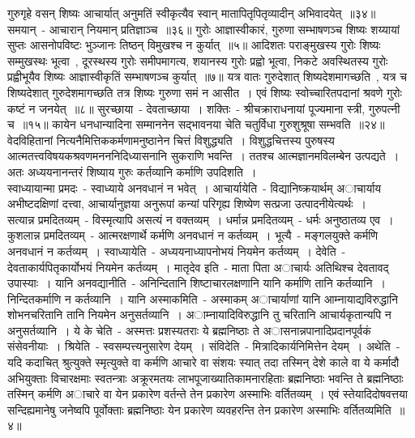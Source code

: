 \indent  गुरुगृहे वसन् शिष्यः आचार्यात्  अनुमतिं स्वीकृत्यैव स्वान्  मातापितृपितृव्यादीन् अभिवादयेत्~॥३४॥
\indent समयान्~- आचारान् नियमान् प्रतिज्ञाञ्च~॥३६॥
\indent गुरोः आज्ञास्वीकारं, गुरुणा सम्भाषणञ्च शिष्यः शय्यायां सुप्तः आसनोपविष्टः भुञ्जानः तिष्ठन् विमुखश्च न कुर्यात्~॥५॥
\indent  आदिशतः पराङ्मुखस्य गुरोः शिष्यः सम्मुखस्थः भूत्वा~, दूरस्थस्य गुरोः समीपमागत्य, शयानस्य गुरोः प्रह्वो भूत्वा, निकटे अवस्थितस्य गुरोः प्रह्वीभूयैव शिष्यः आज्ञास्वीकृतिं सम्भाषणञ्च कुर्यात्~॥७॥
\indent  यत्र वातः गुरुदेशात् शिष्यदेशमागच्छति~, यत्र च शिष्यदेशात् गुरुदेशमागच्छति तत्र शिष्यः गुरुणा समं न आसीत~। एवं    शिष्यः स्वोच्चारितपदानां श्रवणे गुरोः कष्टं न जनयेत्~॥८॥
\indent  सुरच्छाया~- देवताच्छाया~। शक्तिः~- श्रीचक्राराधनायां पूज्यमाना स्त्री, गुरुपत्नी च~॥१५॥
\indent कायेन धनधान्यादिना सम्माननेन सद्भावनया चेति चतुर्विधा गुरुशुश्रूषा सम्भवति~॥२४॥
\indent वेदविहितानां नित्यनैमित्तिककर्मणामनुष्ठानेन चित्तं विशुद्ध्यति~। विशुद्धचित्तस्य पुरुषस्य आत्मतत्त्वविषयकश्रवणमनननिदिध्यासनानि सुकराणि भवन्ति~। ततश्च आत्मज्ञानमविलम्बेन उत्पद्यते~। अतः अध्ययनानन्तरं शिष्याय गुरुः कर्तव्यानि कर्माणि उपदिशति~।\\ स्वाध्यायान्मा प्रमदः~- स्वाध्याये अनवधानं न भवेत्~। आचार्यायेति~- विद्यानिष्क्रयार्थम् अाचार्याय अभीष्टदक्षिणां दत्त्वा, आचार्यानुज्ञया अनुरूपां कन्यां परिगृह्य शिष्येण सत्प्रजा उत्पादनीयेत्यर्थः~।\\ \indent सत्यान्न प्रमदितव्यम्~- विस्मृत्यापि असत्यं न वक्तव्यम्~। धर्मान्न प्रमदितव्यम्~- धर्मः अनुष्ठातव्य एव~। कुशलान्न प्रमदितव्यम्~- आत्मरक्षणार्थे कर्मणि अनवधानं न कर्तव्यम्~। भूत्यै~- मङ्गलयुक्ते कर्मणि अनवधानं न कर्तव्यम्~। स्वाध्यायेति~- अध्ययनाध्यापनोभयं नियमेन कर्तव्यम्~। देवेति~- देवताकार्यपितृकार्योभयं नियमेन कर्तव्यम्~। मातृदेव इति~- माता पिता अाचार्यः अतिथिश्च देवतावद् उपास्याः~। यानि अनवद्यानीति~- अनिन्दितानि शिष्टाचारलक्षणानि यानि कर्माणि तानि कर्तव्यानि~। निन्दितकर्माणि न कर्तव्यानि~। यानि अस्माकमिति~- अस्माकम् अाचार्याणां यानि आम्नायाद्यविरुद्धानि शोभनचरितानि तानि नियमेन अनुसर्तव्यानि~। अाम्नायादिविरुद्धानि तु चरितानि आचार्यकृतान्यपि न अनुसर्तव्यानि~। ये के चेति~- अस्मत्तः प्रशस्यतराः ये ब्रह्मनिष्ठाः ते अासनान्नपानादिप्रदानपूर्वकं संसेवनीयाः~। श्रियेति~- स्वसम्पत्त्यनुसारेण देयम्~। संविदेति~- मित्रादिकार्यनिमित्तेन देयम्~। अथेति~- यदि कदाचित् श्रुत्युक्ते स्मृत्युक्ते वा कर्मणि आचारे वा संशयः स्यात् तदा तस्मिन् देशे काले वा ये कर्मादौ अभियुक्ताः विचारक्षमाः स्वतन्त्राः अक्रूरमतयः लाभपूजाख्यातिकामनारहिताः ब्रह्मनिष्ठाः भवन्ति ते ब्रह्मनिष्ठाः तस्मिन् कर्मणि अाचारे वा येन प्रकारेण वर्तन्ते तेन प्रकारेण अस्माभिः वर्तितव्यम्~। एवं स्तेयादिदोषवत्तया सन्दिह्यमानेषु जनेष्वपि पूर्वोक्ताः ब्रह्मनिष्ठाः येन प्रकारेण व्यवहरन्ति तेन प्रकारेण अस्माभिः वर्तितव्यमिति~॥४॥
